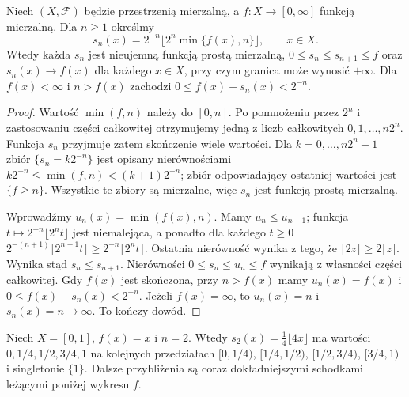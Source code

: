 \begin{twierdzenie}
\label{thm:simple-up}
Niech $(X,\mathcal F)$ będzie przestrzenią mierzalną,
a $f:X\to[0,\infty]$ funkcją mierzalną. Dla
$n\ge1$ określmy
\begin{equation}\label{eq:canonical-simple}
s_n(x)=2^{-n}\Big\lfloor 2^n\min\{f(x),n\}\Big\rfloor,
\qquad x\in X.
\end{equation}
Wtedy każda $s_n$ jest nieujemną funkcją prostą mierzalną,
$0\le s_n\le s_{n+1}\le f$ oraz
$s_n(x)\to f(x)$ dla każdego $x\in X$,
przy czym granica może wynosić $+\infty$.
Dla $f(x)<\infty$ i $n>f(x)$ zachodzi
$0\le f(x)-s_n(x)<2^{-n}$.
\end{twierdzenie}
\begin{proof}
Wartość $\min(f,n)$ należy do $[0,n]$.
Po pomnożeniu przez $2^n$ i zastosowaniu części
całkowitej otrzymujemy jedną z liczb całkowitych
$0,1,\ldots,n2^n$. Funkcja $s_n$ przyjmuje zatem
skończenie wiele wartości. Dla $k=0,\ldots,n2^n-1$
zbiór $\{s_n=k2^{-n}\}$ jest opisany nierównościami
$k2^{-n}\le\min(f,n)<(k+1)2^{-n}$;
zbiór odpowiadający ostatniej wartości jest
$\{f\ge n\}$. Wszystkie te zbiory są mierzalne,
więc $s_n$ jest funkcją prostą mierzalną.

Wprowadźmy $u_n(x)=\min(f(x),n)$. Mamy
$u_n\le u_{n+1}$; funkcja
$t\mapsto 2^{-n}\lfloor2^nt\rfloor$ jest niemalejąca,
a ponadto dla każdego $t\ge0$
$2^{-(n+1)}\lfloor2^{n+1}t\rfloor\ge
2^{-n}\lfloor2^nt\rfloor$.
Ostatnia nierówność wynika z tego, że
$\lfloor2z\rfloor\ge2\lfloor z\rfloor$.
Wynika stąd $s_n\le s_{n+1}$. Nierówności
$0\le s_n\le u_n\le f$ wynikają z własności
części całkowitej. Gdy $f(x)$ jest skończona,
przy $n>f(x)$ mamy $u_n(x)=f(x)$ i
$0\le f(x)-s_n(x)<2^{-n}$.
Jeżeli $f(x)=\infty$, to $u_n(x)=n$ i
$s_n(x)=n\to\infty$. To kończy dowód.
\end{proof}

\begin{przyklad}
Niech $X=[0,1]$, $f(x)=x$ i $n=2$.
Wtedy $s_2(x)=\frac14\lfloor4x\rfloor$ ma wartości
$0,1/4,1/2,3/4,1$ na kolejnych przedziałach
$[0,1/4)$, $[1/4,1/2)$, $[1/2,3/4)$,
$[3/4,1)$ i singletonie $\{1\}$.
Dalsze przybliżenia są coraz dokładniejszymi
schodkami leżącymi poniżej wykresu $f$.
\end{przyklad}

